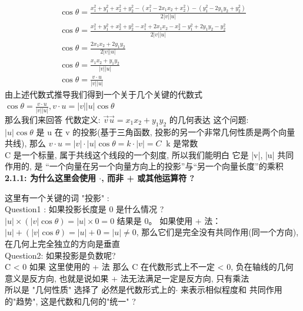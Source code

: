 \documentclass[12pt]{article}
\begin{document}
\begin{flushleft}
\begin{itemize}
\begin{align}
                  \cos\theta = \frac{x_{1}^{2} + y_{1}^{2} +  x_{2}^{2} + y_{2}^{2} -
                  (x_{1}^{2} - 2x_{1}x_{2} + x_{2}^{2}) -  (y_{1}^{2} - 2y_{1}y_{2} + y_{2}^{2})}{2|v||u|}                               \\
                  \cos\theta = \frac{x_{1}^{2} + y_{1}^{2} +  x_{2}^{2} + y_{2}^{2} -
                  x_{1}^{2} + 2x_{1}x_{2} - x_{2}^{2} -  y_{1}^{2} + 2y_{1}y_{2} - y_{2}^{2}}{2|v||u|}                                   \\
                  \cos\theta = \frac{2x_{1}x_{2} + 2y_{1}y_{2}}{2|v||u|}                                                                 \\
                  \cos\theta = \frac{x_{1}x_{2} + y_{1}y_{2}}{|v||u|}                                                                    \\
                  \cos\theta = \frac{v\cdot u}{|v||u|}
              \end{align}
              由上述代数式推导我们得到一个关于几个关键的代数式 $\cos\theta = \frac{v\cdot u}{|v||u|}, v\cdot u = |v||u|\cos\theta $ \\
              那么我们来回答 代数定义:  $\vec{v}\vec{u} = x_{1}x_{2} + y_{1}y_{2}$ 的几何表达 这个问题: \\
              $|u|\cos\theta$ 是 u 在 v 的投影(基于三角函数, 投影的另一个非常几何性质是两个向量共线), 那么  $v\cdot u = |v| \cdot |u|\cos\theta = k \cdot |v| = C \;\; \text{k 是常数}$ \\
              C 是一个标量, 属于共线这个线段的一个刻度, 所以我们能明白 它是 |v|, |u| 共同作用的, 是 “一个向量在另一个向量方向上的投影”与“另一个向量长度”的乘积 \\

              \vspace{0.3em}
              \textbf{2.1.1: 为什么这里会使用 $\cdot$, 而非 + 或其他运算符 ?}

              这里有一个关键的词 "投影" :  \\
              Question1 : 如果投影长度是 0 是什么情况 ? \\
              $ |u| \times (|v|\cos\theta) = |u| \times 0 = 0 $ 结果是 0。 如果使用 + 法： $ |u| + (|v|\cos\theta) = |u| + 0 = |u| \neq 0 $, 那么它们是完全没有共同作用(同一个方向), 在几何上完全独立的方向是垂直 \\
              Question2: 如果投影是负数呢? \\
              C < 0 如果 这里使用的 + 法 那么 C 在代数形式上不一定 < 0,  负在轴线的几何意义是反方向, 也就是说如果 + 法无法满足一定是反方向, 只有乘法 \\
              所以是 "几何性质" 选择了 必然是代数形式上的$\cdot$ 来表示相似程度和 共同作用的"趋势", 这是代数和几何的"统一" ?


\end{itemize}
\end{flushleft}
\end{document}
